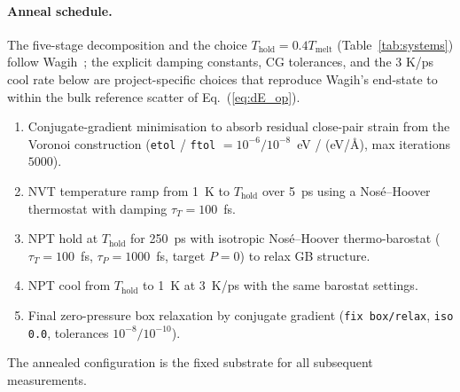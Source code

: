 \paragraph*{Anneal schedule.}
The five-stage decomposition and the choice $T_\mathrm{hold} = 0.4
T_\mathrm{melt}$ (Table~\ref{tab:systems}) follow Wagih~\cite{Wagih2020};
the explicit damping constants, CG tolerances, and the 3 K/ps cool
rate below are project-specific choices that reproduce Wagih's
end-state to within the bulk reference scatter of
Eq.~(\ref{eq:dE_op}).
\begin{enumerate}\itemsep0pt\setlength{\leftmargin}{0pt}
\item Conjugate-gradient minimisation to absorb residual close-pair strain from the Voronoi construction (\texttt{etol} / \texttt{ftol} $= 10^{-6} / 10^{-8}$~eV / (eV/\AA), max iterations $5000$).
\item NVT temperature ramp from 1~K to $T_\mathrm{hold}$ over 5~ps using a Nos\'e--Hoover thermostat with damping $\tau_T = 100$~fs.
\item NPT hold at $T_\mathrm{hold}$ for 250~ps with isotropic Nos\'e--Hoover thermo-barostat ($\tau_T = 100$~fs, $\tau_P = 1000$~fs, target $P = 0$) to relax GB structure.
\item NPT cool from $T_\mathrm{hold}$ to 1~K at $3$~K/ps with the same barostat settings.
\item Final zero-pressure box relaxation by conjugate gradient (\texttt{fix box/relax}, \texttt{iso 0.0}, tolerances $10^{-8} / 10^{-10}$).
\end{enumerate}
The annealed configuration is the fixed substrate for all subsequent
measurements.



